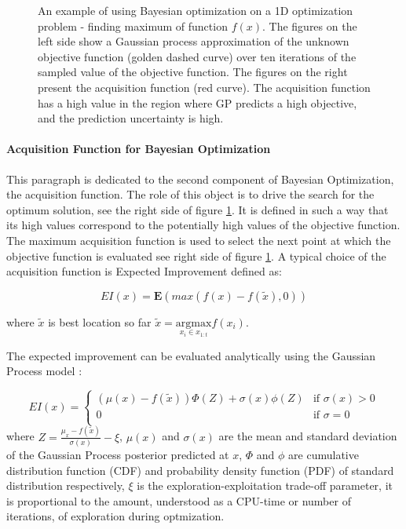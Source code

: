 \begin{figure}[!ht]
\caption{An example of using Bayesian optimization on a 1D optimization problem - finding maximum of function $f(x)$. 
The figures on the left side show a Gaussian process approximation of the unknown objective function (golden dashed curve) over ten iterations of the sampled value of the objective function. The figures on the right present the acquisition function (red curve). The acquisition function has a high value in the region where GP predicts a high objective, and the prediction uncertainty is high. 
\label{fig:BO}}
\end{figure}

\paragraph{ Acquisition Function for Bayesian Optimization} \mbox{}

This paragraph is dedicated to the second component of Bayesian Optimization, the acquisition function. The role of this object is to drive the search for the optimum solution, see the right side of figure \ref{fig:BO}. It is defined in such a way that its high values correspond to the potentially high values of the objective function. The maximum acquisition function is used to select the next point at which the objective function is evaluated see right side of figure \ref{fig:BO}. A typical choice of the acquisition function is Expected Improvement defined as: 

\begin{equation}
    EI(x) = \mathbf{E}\left(max( f(x)-f(\widetilde{x}) , 0) \right) 
\end{equation}

where $\widetilde{x}$ is best location so far $\widetilde{x} = \underset{{x_i \in x_{1:t}}}{\mathrm{argmax}} f(x_i)$. 

The expected improvement can be evaluated analytically using the Gaussian Process model \cite{GaussianProcesses}: 

\begin{equation}
    EI(x) =   \left\{ \begin{array}{ll}
(\mu(x)-f(\widetilde{x}))\Phi(Z) + \sigma(x)\phi(Z) & \textrm{if $\sigma(x)>0$}\\
0 & \textrm{if  $\sigma=0$}\\
\end{array} \right.
\end{equation}
where $Z= \frac{\mu_{x}-f(\widetilde{x})}{\sigma(x)}-\xi$, $\mu(x)$ and $\sigma(x)$ are the mean and standard deviation of the Gaussian Process posterior predicted at $x$, $\Phi$ and $\phi$ are cumulative distribution function (CDF) and probability density function (PDF) of standard distribution respectively, $\xi$ is the exploration-exploitation trade-off parameter, it is proportional to the amount, understood as a CPU-time or number of iterations, of exploration during optmization. 

